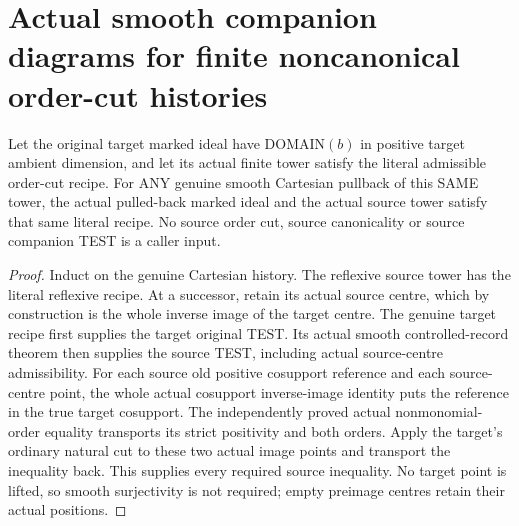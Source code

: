 \section{Actual smooth companion diagrams for finite noncanonical order-cut histories}

\begin{theorem}
\label{hir:original-finite-order-cut-smooth-source-history}
\leanok
Let the original target marked ideal have DOMAIN$(b)$ in positive target
ambient dimension, and let its actual finite tower satisfy the literal
admissible order-cut recipe. For ANY genuine smooth Cartesian pullback
of this SAME tower, the actual pulled-back marked ideal and the actual
source tower satisfy that same literal recipe. No source order cut,
source canonicality or source companion TEST is a caller input.
\end{theorem}
\begin{proof}
Induct on the genuine Cartesian history. The reflexive source tower has
the literal reflexive recipe. At a successor, retain its actual source
centre, which by construction is the whole inverse image of the target
centre. The genuine target recipe first supplies the target original TEST.
Its actual smooth controlled-record theorem then supplies the source TEST,
including actual source-centre admissibility. For each source old positive
cosupport reference and each source-centre point, the whole actual
cosupport inverse-image identity puts the reference in the true target
cosupport. The independently proved actual nonmonomial-order equality
transports its strict positivity and both orders. Apply the target's
ordinary natural cut to these two actual image points and transport the
inequality back. This supplies every required source inequality. No target
point is lifted, so smooth surjectivity is not required; empty preimage
centres retain their actual positions.
\end{proof}

